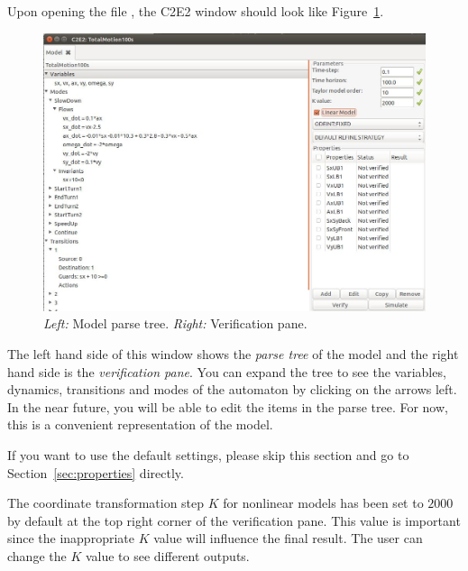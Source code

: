 \documentclass{tufte-book} %
\begin{document}
Upon opening the file , the C2E2 window should look like Figure~\ref{fig:parsetree}.  

\begin{figure}[h!]
\centerline{\includegraphics[scale=.22,keepaspectratio=true]{Manual_ver0_2_image/GUI.jpg}}
\caption{{\em Left:\/} Model parse tree. {\em Right:\/} Verification pane.} 
\label{fig:parsetree}
\end{figure}

The left hand side of this window shows the {\em parse tree \/}of the model
and the right hand side is the {\em verification pane\/}.
You can expand the tree to see the variables, dynamics, transitions and modes of the automaton by clicking on the arrows left.
In the near future, you will be able to edit the items in the parse tree. 
For now, this is a convenient representation of the model. 

If you want to use the default settings, please skip this section and go to Section~\ref{sec:properties} directly.

The coordinate transformation step $K$ for nonlinear models has been set to $2000$ by default at the top right corner of the verification pane. This value is important since the inappropriate $K$ value will influence the final result. The user can change the $K$ value to see different outputs.

~\newline
~\newline
\end{document}
